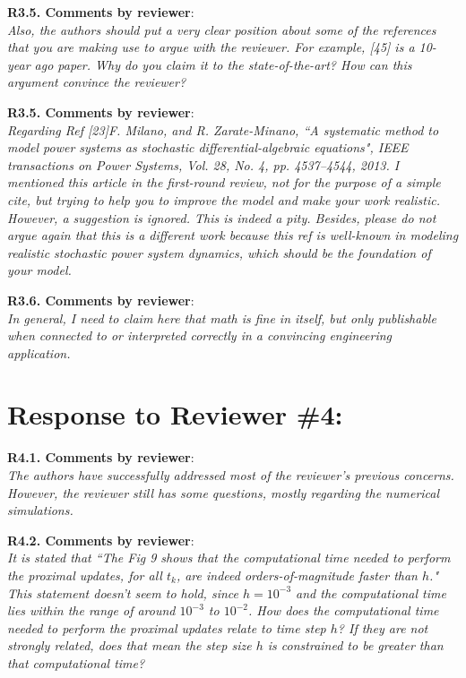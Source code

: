 \documentclass[12pt,onecolumn]{IEEEtran}
\newcommand{\blue}{\color{blue}}
\newcommand{\nib}{\noindent  {\bf Response:} }
\begin{document}
{\nib \blue{Thanks for this comment. The}}


\noindent
{\bf R3.5. Comments by reviewer}:\\
{\em Also, the authors should put a very clear position about some of the references that you are making use to argue with the reviewer. For example,  [45] is a 10-year ago paper. Why do you claim it to the state-of-the-art?  How can this argument convince the reviewer?}

{\nib \blue{The }}


\noindent
{\bf R3.5. Comments by reviewer}:\\
{\em Regarding Ref [23]F. Milano, and R. Zarate-Minano, ``A systematic method to model power systems as stochastic differential-algebraic equations", IEEE transactions on Power Systems, Vol. 28, No. 4, pp. 4537--4544, 2013. I mentioned this article in the first-round review, not for the purpose of a simple cite, but trying to help you to improve the model and make your work realistic. However, a suggestion is ignored. This is indeed a pity. Besides, please do not argue again that this is a different work because this ref is well-known in modeling realistic stochastic power system dynamics, which should be the foundation of your model.}

{\nib \blue{The }}


\noindent
{\bf R3.6. Comments by reviewer}:\\
{\em In general, I need to claim here that math is fine in itself, but only publishable when connected to or interpreted correctly in a convincing engineering application.}
 
{\nib \blue{The }}



\newpage
\section*{\large \bf Response to Reviewer \#4:}

\noindent
{\bf R4.1. Comments by reviewer}:\\
{\em The authors have successfully addressed most of the reviewer's previous concerns. However, the reviewer still has some questions, mostly regarding the numerical simulations.}

{\nib \blue{Thank you. Please find our itemized responses to the questions related to numerical simulations.}}


\noindent
{\bf R4.2. Comments by reviewer}:\\
{\em It is stated that ``The Fig 9 shows that the computational time needed to perform the proximal updates, for all $t_k$, are indeed orders-of-magnitude faster than $h$."
This statement doesn't seem to hold, since $h=10^{-3}$ and the computational time lies within the range of around $10^{-3}$ to $10^{-2}$. How does the computational time needed to perform the proximal updates relate to time step $h$? If they are not strongly related, does that mean the step size $h$ is constrained to be greater than that computational time?}
\end{document}
